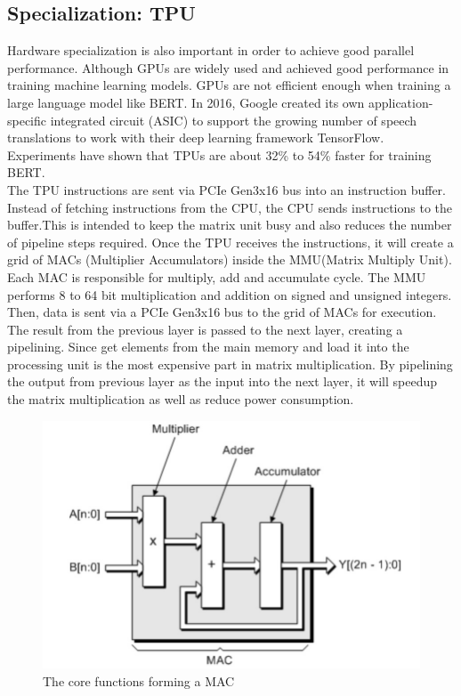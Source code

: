 \documentclass[conference]{IEEEtran}
\begin{document}
	\subsection{Specialization: TPU}
	Hardware specialization is also important in order to achieve good parallel performance. Although GPUs are widely used and achieved good performance in training machine learning models. GPUs are not efficient enough when training a large language model like BERT. In 2016, Google created its own application-specific integrated circuit (ASIC) to support the growing number of speech translations to work with their deep learning framework TensorFlow.\cite{TPUpaper} Experiments have shown that TPUs are about 32\% to 54\% faster for training BERT.\\
	
	The TPU instructions are sent via PCIe Gen3x16 bus into an instruction buffer. Instead of fetching instructions from the CPU, the CPU sends instructions to the buffer.This is intended to keep the matrix unit busy and also reduces the number of pipeline steps required. Once the TPU receives the instructions, it will create a grid of MACs (Multiplier Accumulators) inside the MMU(Matrix Multiply Unit). Each MAC is responsible for multiply, add and accumulate cycle. The MMU performs 8 to 64 bit multiplication and addition on signed and unsigned integers. Then, data is sent via a PCIe Gen3x16 bus to the grid of MACs for execution. The result from the previous layer is passed to the next layer, creating a pipelining. Since get elements from the main memory and load it into the processing unit is the most expensive part in matrix multiplication. By pipelining the output from previous layer as the input into the next layer, it will speedup the matrix multiplication as well as reduce power consumption.\\
	
	\begin{figure}[!htbp]
		\centering
		\includegraphics[scale=0.5]{figures/figure9.png}
		\caption{\label{fig:my-label} The core functions forming a MAC \cite{MAC}}
	\end{figure}
\end{document}
